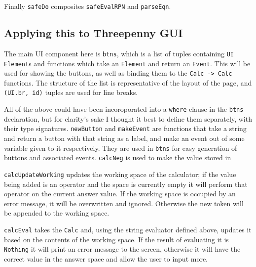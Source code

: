 \documentclass[12pt]{article}
\begin{document}


Finally \verb|safeDo| composites \verb|safeEvalRPN| and \verb|parseEqn|.

\subsection{Applying this to Threepenny GUI}



The main UI component here is \verb|btns|, which is a list of tuples containing \verb|UI Element|s and functions which take an \verb|Element| and return an \verb|Event|.
This will be used for showing the buttons, as well as binding them to the \verb|Calc -> Calc| functions.
The structure of the list is representative of the layout of the page, and \verb|(UI.br, id)| tuples are used for line breaks.



All of the above could have been incoroporated into a \verb|where| clause in the \verb|btns| declaration, but for clarity's sake I thought it best to define them separately, with their type signatures.
\verb|newButton| and \verb|makeEvent| are functions that take a string and return a button with that string as a label, and make an event out of some variable given to it respectively.
They are used in \verb|btns| for easy generation of buttons and associated events.
\verb|calcNeg| is used to make the value stored in 




\verb|calcUpdateWorking| updates the working space of the calculator; if the value being added is an operator and the space is currently empty it will perform that operator on the current answer value.
If the working space is occupied by an error message, it will be overwritten and ignored.
Otherwise the new token will be appended to the working space.



\verb|calcEval| takes the \verb|Calc| and, using the string evaluator defined above, updates it based on the contents of the working space.
If the result of evaluating it is \verb|Nothing| it will print an error message to the screen, otherwise it will have the correct value in the answer space and allow the user to input more.
\end{document}
